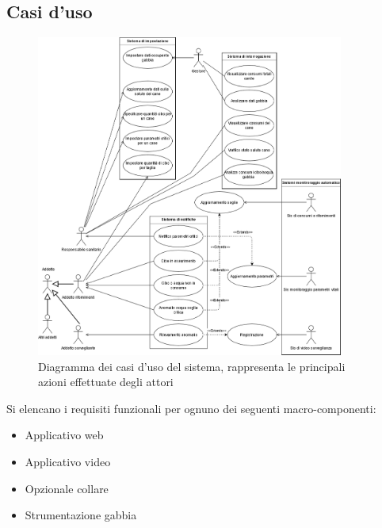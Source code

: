 	    \subsection{Casi d'uso}
            \begin{figure}[ht]
                \caption{Diagramma dei casi d'uso del sistema, rappresenta le principali azioni effettuate degli attori}
                \centering
                \includegraphics[width=0.9\textwidth]{DrawIo/useCaseWholeSystem.png}
            \end{figure}
            
    	Si elencano i requisiti funzionali per ognuno dei seguenti macro-componenti:
	    \begin{itemize}
            \item Applicativo web 
            \item Applicativo video
            \item Opzionale collare
            \item Strumentazione gabbia
        \end{itemize}
        
